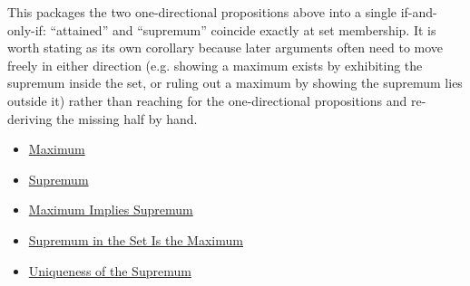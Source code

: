 \begin{remark*}[Interpretation]
This packages the two one-directional propositions above into a single
if-and-only-if: ``attained'' and ``supremum'' coincide exactly at set
membership. It is worth stating as its own corollary because later
arguments often need to move freely in either direction (e.g. showing a
maximum exists by exhibiting the supremum inside the set, or ruling out a
maximum by showing the supremum lies outside it) rather than reaching for
the one-directional propositions and re-deriving the missing half by hand.
\end{remark*}

\begin{dependencies}
\begin{itemize}
  \item \hyperref[def:maximum]{Maximum}
  \item \hyperref[def:supremum]{Supremum}
  \item \hyperref[prop:maximum-implies-supremum]{Maximum Implies Supremum}
  \item \hyperref[prop:supremum-in-the-set-is-the-maximum]{Supremum in the Set Is the Maximum}
  \item \hyperref[prop:uniqueness-of-the-supremum]{Uniqueness of the Supremum}
\end{itemize}
\end{dependencies}
